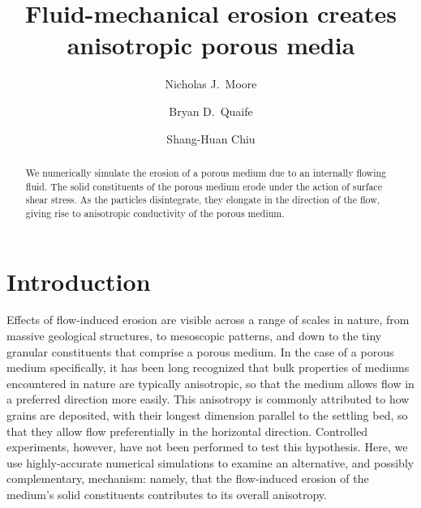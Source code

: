 \documentclass[3p]{elsarticle}
\begin{document}
\title{Fluid-mechanical erosion creates anisotropic porous media}


\author{Nicholas J.~Moore}
\author{Bryan D.~Quaife}
\author{Shang-Huan Chiu}

\begin{abstract}
We numerically simulate the erosion of a porous medium due to an internally flowing fluid.  The solid constituents of the porous medium erode under the action of surface shear stress. As the particles disintegrate, they elongate in the direction of the flow, giving rise to anisotropic conductivity of the porous medium.
\end{abstract}
\maketitle



\section{Introduction}

Effects of flow-induced erosion are visible across a range of scales in nature, from massive geological structures, to mesoscopic patterns, and down to the tiny granular constituents that comprise a porous medium. In the case of a porous medium specifically, it has been long recognized that bulk properties of mediums encountered in nature are typically anisotropic, so that the medium allows flow in a preferred direction more easily. This anisotropy is commonly attributed to how grains are deposited, with their longest dimension parallel to the settling bed, so that they allow flow preferentially in the horizontal direction. Controlled experiments, however, have not been performed to test this hypothesis. Here, we use highly-accurate numerical simulations to examine an alternative, and possibly complementary, mechanism: namely, that the flow-induced erosion of the medium's solid constituents contributes to its overall anisotropy.
\end{document}
